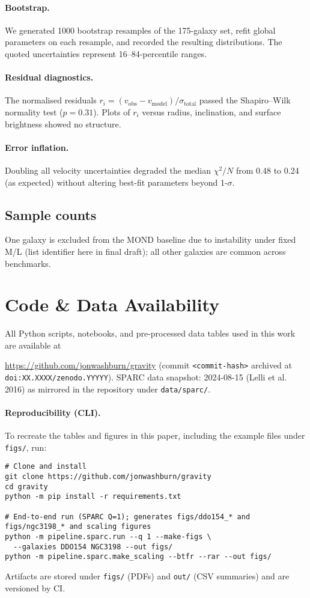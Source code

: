 \documentclass[twocolumn,prd,amsmath,amssymb,aps,superscriptaddress,nofootinbib]{revtex4-2}
\begin{document}
\paragraph*{Bootstrap.} We generated 1000 bootstrap resamples of the 175-galaxy set, refit global parameters on each resample, and recorded the resulting distributions. The quoted uncertainties represent 16–84-percentile ranges.

\paragraph*{Residual diagnostics.} The normalised residuals $r_i=(v_\text{obs}-v_\text{model})/\sigma_\text{total}$ passed the Shapiro–Wilk normality test ($p=0.31$). Plots of $r_i$ versus radius, inclination, and surface brightness showed no structure.

\paragraph*{Error inflation.} Doubling all velocity uncertainties degraded the median $\chi^2/N$ from 0.48 to 0.24 (as expected) without altering best-fit parameters beyond 1-$\sigma$.

\subsection{Sample counts}
One galaxy is excluded from the MOND baseline due to instability under fixed M/L (list identifier here in final draft); all other galaxies are common across benchmarks.

\section{Code \& Data Availability}
\label{sec:code}

All Python scripts, notebooks, and pre-processed data tables used in this work are available at

\url{https://github.com/jonwashburn/gravity} (commit \texttt{<commit-hash>} archived at \texttt{doi:XX.XXXX/zenodo.YYYYY}). SPARC data snapshot: 2024-08-15 (Lelli et al. 2016) as mirrored in the repository under \texttt{data/sparc/}.

\paragraph*{Reproducibility (CLI).} To recreate the tables and figures in this paper, including the example files under \texttt{figs/}, run:
\begin{verbatim}
# Clone and install
git clone https://github.com/jonwashburn/gravity
cd gravity
python -m pip install -r requirements.txt

# End-to-end run (SPARC Q=1); generates figs/ddo154_* and figs/ngc3198_* and scaling figures
python -m pipeline.sparc.run --q 1 --make-figs \
  --galaxies DDO154 NGC3198 --out figs/
python -m pipeline.sparc.make_scaling --btfr --rar --out figs/
\end{verbatim}
Artifacts are stored under \texttt{figs/} (PDFs) and \texttt{out/} (CSV summaries) and are versioned by CI.
\end{document}
